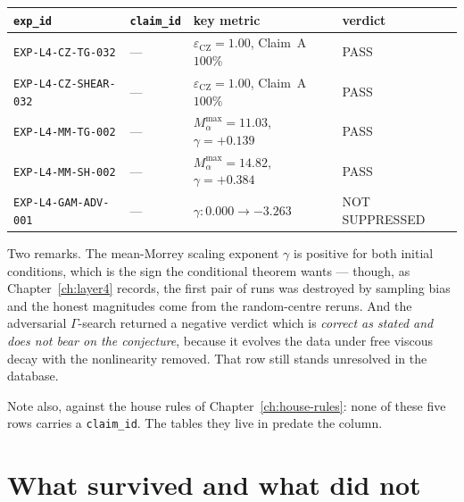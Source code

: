 \begin{center}
\small
\begin{tabular}{@{}l l l l@{}}
\toprule
\texttt{exp\_id} & \texttt{claim\_id} & key metric & verdict \\
\midrule
\texttt{EXP-L4-CZ-TG-032} & --- & \(\varepsilon_{\mathrm{CZ}}=1.00\), Claim~A \(100\%\) & \textsf{PASS} \\
\texttt{EXP-L4-CZ-SHEAR-032} & --- & \(\varepsilon_{\mathrm{CZ}}=1.00\), Claim~A \(100\%\) & \textsf{PASS} \\
\texttt{EXP-L4-MM-TG-002} & --- & \(M_\alpha^{\max}=11.03\), \(\gamma=+0.139\) & \textsf{PASS} \\
\texttt{EXP-L4-MM-SH-002} & --- & \(M_\alpha^{\max}=14.82\), \(\gamma=+0.384\) & \textsf{PASS} \\
\texttt{EXP-L4-GAM-ADV-001} & --- & \(\gamma:0.000\to-3.263\) & \textsf{NOT SUPPRESSED} \\
\bottomrule
\end{tabular}
\end{center}

\medskip
Two remarks. The mean-Morrey scaling exponent \(\gamma\) is positive for both
initial conditions, which is the sign the conditional theorem wants ---
though, as Chapter~\ref{ch:layer4} records, the first pair of runs was
destroyed by sampling bias and the honest magnitudes come from the random-centre
reruns. And the adversarial \(\Gamma\)-search returned a negative verdict which
is \emph{correct as stated and does not bear on the conjecture}, because it
evolves the data under free viscous decay with the nonlinearity removed. That
row still stands unresolved in the database.

Note also, against the house rules of Chapter~\ref{ch:house-rules}: none of
these five rows carries a \texttt{claim\_id}. The tables they live in predate
the column.

\section{What survived and what did not}
\label{sec:claima-survived}

